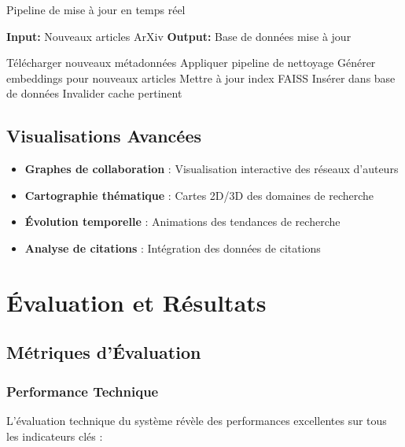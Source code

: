 \documentclass[12pt,a4paper]{article}
\begin{document}
\begin{algorithm}[H]
\caption{Pipeline de mise à jour en temps réel}
\begin{algorithmic}[1]
\STATE \textbf{Input:} Nouveaux articles ArXiv
\STATE \textbf{Output:} Base de données mise à jour

    \STATE Télécharger nouveaux métadonnées
    \STATE Appliquer pipeline de nettoyage
    \STATE Générer embeddings pour nouveaux articles
    \STATE Mettre à jour index FAISS
    \STATE Insérer dans base de données
    \STATE Invalider cache pertinent
\ENDWHILE
\end{algorithmic}
\end{algorithm}

\subsection{Visualisations Avancées}

\begin{itemize}
    \item \textbf{Graphes de collaboration} : Visualisation interactive des réseaux d'auteurs
    \item \textbf{Cartographie thématique} : Cartes 2D/3D des domaines de recherche
    \item \textbf{Évolution temporelle} : Animations des tendances de recherche
    \item \textbf{Analyse de citations} : Intégration des données de citations
\end{itemize}

\section{Évaluation et Résultats}

\subsection{Métriques d'Évaluation}

\subsubsection{Performance Technique}

L'évaluation technique du système révèle des performances excellentes sur tous les indicateurs clés :
\end{document}
